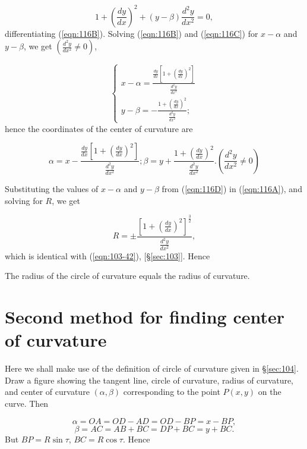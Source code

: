 \begin{equation}
\label{eqn:116C}
1 + \left( \frac{dy}{dx} \right)^2 + (y - \beta) \frac{d^2 y}{dx^2} = 0, 
\end{equation}
differentiating (\ref{eqn:116B}).
Solving (\ref{eqn:116B}) and (\ref{eqn:116C}) for 
$x-\alpha$ and $y-\beta$, we get 
$\left( \frac{d^2 y}{dx^2} \ne 0 \right)$,

\begin{equation}
\label{eqn:116D}
\begin{cases} 
x - \alpha = \frac{\frac{dy}{dx} 
\left[ 1 + \left( \frac{dy}{dx} \right)^2 \right]}{\frac{d^2 y}{dx^2}} \\ 
y - \beta 
= -\frac{1 + \left( \frac{dy}{dx} \right)^2}{\frac{d^2 y}{dx^2}};
\end{cases}
\end{equation}
hence the coordinates of the center of curvature are

\begin{equation}
\label{eqn:116E}
\alpha = x - \frac{\frac{dy}{dx} 
\left[1 + \left( \frac{dy}{dx} \right)^2 \right]}{\frac{d^2 y}{dx^2}}; 
\beta = y + \frac{1 + \left( \frac{dy}{dx} \right)^2}{\frac{d^2 y}{dx^2}}. 
\left( \frac{d^2 y}{dx^2} \ne 0 \right)
\end{equation}

Substituting the values of $x-\alpha$ and $y-\beta$ from 
(\ref{eqn:116D}) in (\ref{eqn:116A}), and solving for $R$, we get

\[
    R = \pm \frac{ \left[ 1 + 
\left( \frac{dy}{dx} \right)^2 \right]^{\frac{3}{2}} }{ \frac{d^2 y}{dx^2} },
\]
which is identical with (\ref{eqn:103-42}), [\S \ref{sec:103}]. 
Hence

\begin{theorem}
The radius of the circle of curvature equals the radius of curvature.
\end{theorem}


\section{Second method for finding center of curvature}
\label{sec:117}

Here we shall make use of the definition of circle of curvature 
given in \S \ref{sec:104}. Draw a figure showing the tangent line, 
circle of curvature, radius of curvature, and center of curvature 
$(\alpha, \beta)$ corresponding to the point $P(x,y)$ on the curve. Then

\[
    \alpha = OA = OD - AD = OD - BP = x - BP,
\]
\[
\beta = AC = AB + BC = DP + BC = y + BC.
\]
But $BP = R\sin \tau$, $BC = R\cos \tau$. Hence

